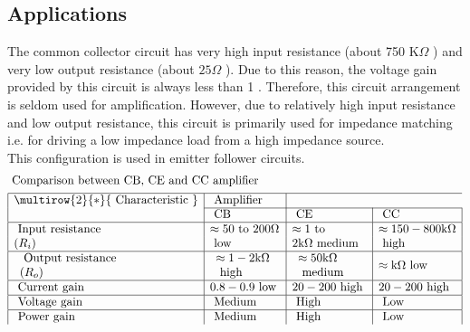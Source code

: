  \subsection{Applications}
  The common collector circuit has very high input resistance (about 750 $\mathrm{K} \Omega$ ) and very low output resistance (about $25 \Omega$ ). Due to this reason, the voltage gain provided by this circuit is always less than 1 . Therefore, this circuit arrangement is seldom used for amplification. However, due to relatively high input resistance and low output resistance, this circuit is primarily used for impedance matching i.e. for driving a low impedance load from a high impedance source.\\
  This configuration is used in emitter follower circuits.
  $$\begin{aligned}
  	&\text { Comparison between CB, CE and CC amplifier }\\
  	&\begin{array}{|l|l|l|l|}
  		\hline \multirow{2}{*}{\text { Characteristic }} & \text { Amplifier } & \multicolumn{2}{l}{} \\
  		\cline { 2 - 4 } & \text { CB } & \text { CE } & \text { CC } \\
  		\hline \text { Input resistance } & \approx 50 \text { to } 200 \Omega & \approx 1 \text { to } & \approx 150-800 \mathrm{k} \Omega \\
  		\left(R_{i}\right) & \text { low } & 2 \mathrm{k} \Omega \text { medium } & \text { high } \\
  		\hline \begin{array}{l}
  			\text { Output resistance } \\
  			\left(R_{o}\right)
  		\end{array} & \begin{array}{l}
  			\approx 1-2 \mathrm{k} \Omega \\
  			\text { high }
  		\end{array} & \begin{array}{l}
  			\approx 50 \mathrm{k} \Omega \\
  			\text { medium }
  		\end{array} & \approx \mathrm{k} \Omega \text { low } \\
  		\hline \text { Current gain } & 0.8-0.9 \text { low } & 20-200 \text { high } & 20-200 \text { high } \\
  		\hline \text { Voltage gain } & \text { Medium } & \text { High } & \text { Low } \\
  		\hline \text { Power gain } & \text { Medium } & \text { High } & \text { Low } \\

\end{array}
\end{aligned}$$

